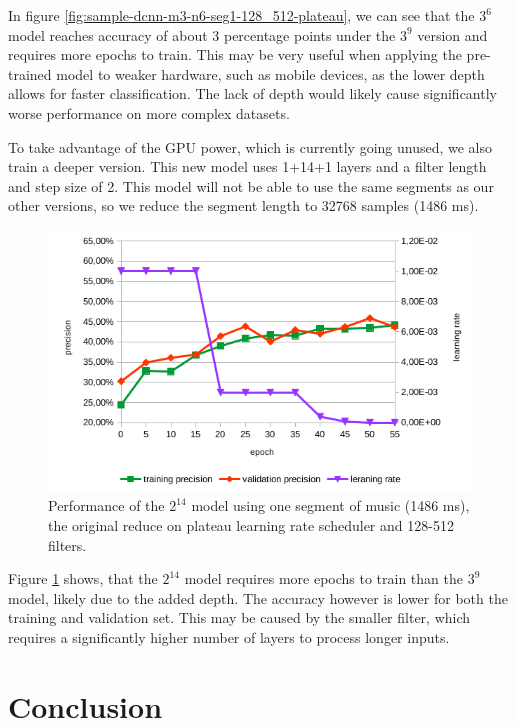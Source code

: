 In figure \ref{fig:sample-dcnn-m3-n6-seg1-128_512-plateau}, we can see that the $3^{6}$ model reaches accuracy of about 3 percentage points under the $3^{9}$ version and requires more epochs to train. This may be very useful when applying the pre-trained model to weaker hardware, such as mobile devices, as the lower depth allows for faster classification. The lack of depth would likely cause significantly worse performance on more complex datasets.

To take advantage of the GPU power, which is currently going unused, we also train a deeper version. This new model uses 1+14+1 layers and a filter length and step size of 2. This model will not be able to use the same segments as our other versions, so we reduce the segment length to 32768 samples (1486 ms).

\begin{figure}[!htb]
	\centering
	\includegraphics[width=.9\linewidth]{images/sample-dcnn-m2-n14-seg1-128_512-plateau.png}
	\caption{Performance of the $2^{14}$ model using one segment of music (1486 ms), the original reduce on plateau learning rate scheduler and 128-512 filters.}
	\label{fig:sample-dcnn-m2-n14-seg1-128_512-plateau}
\end{figure}

Figure \ref{fig:sample-dcnn-m2-n14-seg1-128_512-plateau} shows, that the  $2^{14}$ model requires more epochs to train than the  $3^{9}$ model, likely due to the added depth. The accuracy however is lower for both the training and validation set. This may be caused by the smaller filter, which requires a significantly higher number of layers to process longer inputs.

\section{Conclusion}
\label{sec:conclusion}

